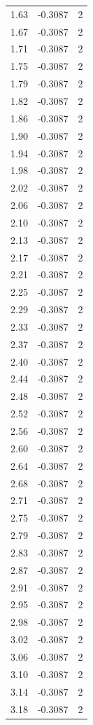 \begin{longtable}{lrr}
  1.63 & -0.3087 & 2 \\
  1.67 & -0.3087 & 2 \\
  1.71 & -0.3087 & 2 \\
  1.75 & -0.3087 & 2 \\
  1.79 & -0.3087 & 2 \\
  1.82 & -0.3087 & 2 \\
  1.86 & -0.3087 & 2 \\
  1.90 & -0.3087 & 2 \\
  1.94 & -0.3087 & 2 \\
  1.98 & -0.3087 & 2 \\
  2.02 & -0.3087 & 2 \\
  2.06 & -0.3087 & 2 \\
  2.10 & -0.3087 & 2 \\
  2.13 & -0.3087 & 2 \\
  2.17 & -0.3087 & 2 \\
  2.21 & -0.3087 & 2 \\
  2.25 & -0.3087 & 2 \\
  2.29 & -0.3087 & 2 \\
  2.33 & -0.3087 & 2 \\
  2.37 & -0.3087 & 2 \\
  2.40 & -0.3087 & 2 \\
  2.44 & -0.3087 & 2 \\
  2.48 & -0.3087 & 2 \\
  2.52 & -0.3087 & 2 \\
  2.56 & -0.3087 & 2 \\
  2.60 & -0.3087 & 2 \\
  2.64 & -0.3087 & 2 \\
  2.68 & -0.3087 & 2 \\
  2.71 & -0.3087 & 2 \\
  2.75 & -0.3087 & 2 \\
  2.79 & -0.3087 & 2 \\
  2.83 & -0.3087 & 2 \\
  2.87 & -0.3087 & 2 \\
  2.91 & -0.3087 & 2 \\
  2.95 & -0.3087 & 2 \\
  2.98 & -0.3087 & 2 \\
  3.02 & -0.3087 & 2 \\
  3.06 & -0.3087 & 2 \\
  3.10 & -0.3087 & 2 \\
  3.14 & -0.3087 & 2 \\
  3.18 & -0.3087 & 2 \\

\end{longtable}
